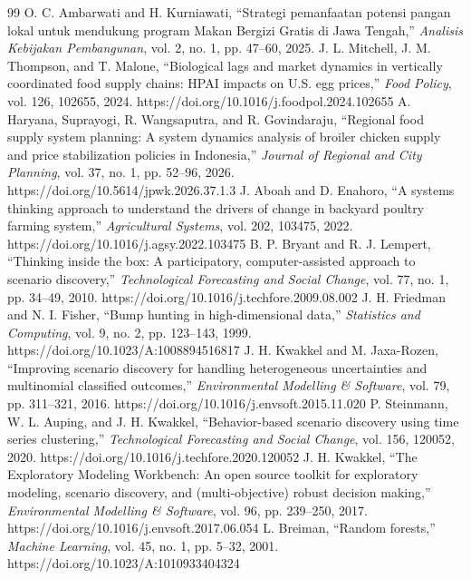 \documentclass[10pt,twocolumn,a4paper]{article}
\begin{document}
\begin{thebibliography}{99}
 O. C. Ambarwati and H. Kurniawati, ``Strategi pemanfaatan potensi pangan lokal untuk mendukung program Makan Bergizi Gratis di Jawa Tengah,'' \textit{Analisis Kebijakan Pembangunan}, vol. 2, no. 1, pp. 47--60, 2025.
 J. L. Mitchell, J. M. Thompson, and T. Malone, ``Biological lags and market dynamics in vertically coordinated food supply chains: HPAI impacts on U.S. egg prices,'' \textit{Food Policy}, vol. 126, 102655, 2024. https://doi.org/10.1016/j.foodpol.2024.102655
 A. Haryana, Suprayogi, R. Wangsaputra, and R. Govindaraju, ``Regional food supply system planning: A system dynamics analysis of broiler chicken supply and price stabilization policies in Indonesia,'' \textit{Journal of Regional and City Planning}, vol. 37, no. 1, pp. 52--96, 2026. https://doi.org/10.5614/jpwk.2026.37.1.3
 J. Aboah and D. Enahoro, ``A systems thinking approach to understand the drivers of change in backyard poultry farming system,'' \textit{Agricultural Systems}, vol. 202, 103475, 2022. https://doi.org/10.1016/j.agsy.2022.103475
 B. P. Bryant and R. J. Lempert, ``Thinking inside the box: A participatory, computer-assisted approach to scenario discovery,'' \textit{Technological Forecasting and Social Change}, vol. 77, no. 1, pp. 34--49, 2010. https://doi.org/10.1016/j.techfore.2009.08.002
 J. H. Friedman and N. I. Fisher, ``Bump hunting in high-dimensional data,'' \textit{Statistics and Computing}, vol. 9, no. 2, pp. 123--143, 1999. https://doi.org/10.1023/A:1008894516817
 J. H. Kwakkel and M. Jaxa-Rozen, ``Improving scenario discovery for handling heterogeneous uncertainties and multinomial classified outcomes,'' \textit{Environmental Modelling \& Software}, vol. 79, pp. 311--321, 2016. https://doi.org/10.1016/j.envsoft.2015.11.020
 P. Steinmann, W. L. Auping, and J. H. Kwakkel, ``Behavior-based scenario discovery using time series clustering,'' \textit{Technological Forecasting and Social Change}, vol. 156, 120052, 2020. https://doi.org/10.1016/j.techfore.2020.120052
 J. H. Kwakkel, ``The Exploratory Modeling Workbench: An open source toolkit for exploratory modeling, scenario discovery, and (multi-objective) robust decision making,'' \textit{Environmental Modelling \& Software}, vol. 96, pp. 239--250, 2017. https://doi.org/10.1016/j.envsoft.2017.06.054
 L. Breiman, ``Random forests,'' \textit{Machine Learning}, vol. 45, no. 1, pp. 5--32, 2001. https://doi.org/10.1023/A:1010933404324

\end{thebibliography}
\end{document}
